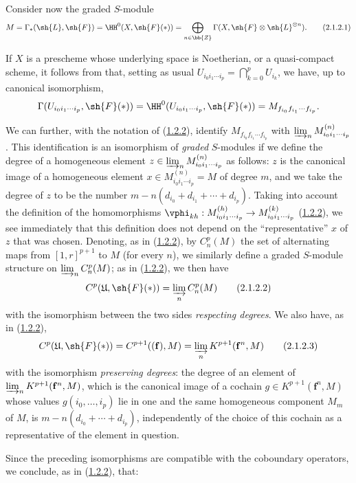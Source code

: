 \begin{env}[2.1.2]
\label{III.2.1.2}
Consider now the graded $S$-module 
\[
\label{III.2.1.2.1}
  M = \Gamma_*(\sh{L},\sh{F}) = \HH^0(X,\sh{F}(*)) = \bigoplus_{n\in\bb{Z}} \Gamma(X,\sh{F}\otimes\sh{L}^{\otimes n}).
  \tag{2.1.2.1}
\]

If $X$ is a prescheme whose underlying space is Noetherian, or a quasi-compact scheme, it follows from  that, setting as usual $U_{i_0 i_1\cdots i_p} = \bigcap_{k=0}^p U_{i_k}$, we have, up to canonical isomorphism,
\[
  \Gamma(U_{i_0 i_1\cdots i_p},\sh{F}(*)) = \HH^0(U_{i_0 i_1\cdots i_p},\sh{F}(*)) = M_{f_{i_0}f_{i_1}\cdots f_{i_p}}.
\]

We can further, with the notation of (\hyperref[III.1.2.2]{1.2.2}), identify $M_{f_{i_0}f_{i_1}\cdots f_{i_p}}$ with $\varinjlim_n M_{i_0 i_1\cdots i_p}^{(n)}$.
This identification is an isomorphism of \emph{graded} $S$-modules if we define the degree of a homogeneous element $z\in\varinjlim_n M_{i_0 i_1\cdots i_p}^{(n)}$ as follows: $z$ is the canonical image of a homogeneous element $x\in M_{i_0 i_1\cdots i_p}^{(n)} = M$ of degree $m$, and we take the degree of $z$ to be the number $m-n(d_{i_0}+d_{i_1}+\cdots+d_{i_p})$.
Taking into account the definition of the homomorphisms $\vphi_{kh}:M_{i_0 i_1\cdots i_p}^{(h)}\to M_{i_0 i_1\cdots i_p}^{(k)}$ (\hyperref[III.1.2.2]{1.2.2}), we see immediately that this definition does not depend on the ``representative'' $x$ of $z$ that was chosen.
Denoting, as in (\hyperref[III.1.2.2]{1.2.2}), by $C_n^p(M)$ the set of alternating maps from $[1,r]^{p+1}$ to $M$ (for every $n$), we similarly define a graded $S$-module structure on $\varinjlim_n C_n^p(M)$; as in (\hyperref[III.1.2.2]{1.2.2}), we then have
\[
\label{III.2.1.2.2}
  C^p(\mathfrak{U},\sh{F}(*)) = \varinjlim_n C_n^p(M)
  \tag{2.1.2.2}
\]
with the isomorphism between the two sides \emph{respecting degrees}.
We also have, as in (\hyperref[III.1.2.2]{1.2.2}),
\[
\label{III.2.1.2.3}
  C^p(\mathfrak{U},\sh{F}(*)) = C^{p+1}((\mathbf{f}),M) = \varinjlim_n K^{p+1}(\mathbf{f}^n,M)
  \tag{2.1.2.3}
\]
with the isomorphism \emph{preserving degrees}: the degree of an element of $\varinjlim_n K^{p+1}(\mathbf{f}^n,M)$, which is the canonical image of a cochain $g\in K^{p+1}(\mathbf{f}^n,M)$ whose values $g(i_0,\dots,i_p)$ lie in one and the same homogeneous component $M_m$ of $M$, is $m-n(d_{i_0}+\cdots+d_{i_p})$, independently of the choice of this cochain as a representative of the element in question.

Since the preceding isomorphisms are compatible with the coboundary operators, we conclude, as in (\hyperref[III.1.2.2]{1.2.2}), that:
\end{env}

